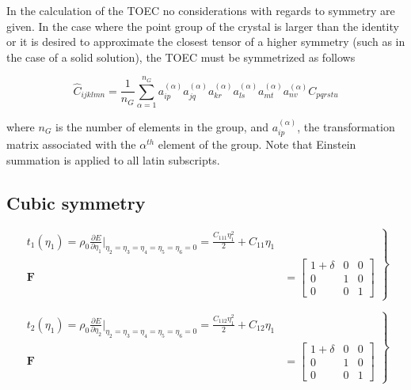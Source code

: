\documentclass[showpacs,aps,floatfix,prb,reprint,superscriptaddress,onecolumn]{revtex4-1}
\begin{document}
\begin{enumerate}
In the calculation of the TOEC no considerations with regards to symmetry are given.  In the case where the point group of the crystal is larger than the identity or it is desired to approximate the closest tensor of a higher symmetry (such as in the case of a solid solution), the TOEC must be symmetrized as follows

\begin{equation}
\hat{C}_{ijklmn} = \frac{1}{n_G} \sum\limits_{\alpha=1}^{n_G}  a^{(\alpha)}_{ip}  a^{(\alpha)}_{jq}  a^{(\alpha)}_{kr}  a^{(\alpha)}_{ls}  a^{(\alpha)}_{mt}  a^{(\alpha)}_{nv} C_{pqrstu}
\end{equation}

where $n_G$ is the number of elements in the group, and $a_{ip}^{(\alpha)}$, the transformation matrix associated with the $\alpha^{th}$ element of the group.  Note that Einstein summation is applied to all latin subscripts.



\subsection{Cubic symmetry}


\begin{equation}
\label{eqn:SM-hexs1}
  \left.\begin{aligned}
        t_{1} \left(\eta_{1}\right) = \rho_{0} \frac{\partial E}{\partial \eta_{1}}\Bigr|_{\eta_2=\eta_3=\eta_4=\eta_5=\eta_6=0} = \frac{C_{111}\eta_{1}^2}{2} + C_{11}\eta_{1}\\
        \bm{F}&=\begin{bmatrix} 1+\delta & 0 & 0 \\ 0 & 1 & 0 \\ 0 & 0 & 1 \end{bmatrix}
       \end{aligned}
			\right\}
\end{equation}


\begin{equation}
\label{eqn:SM-hexs2}
  \left.\begin{aligned}
        t_{2} \left(\eta_{1}\right) = \rho_{0} \frac{\partial E}{\partial \eta_{2}}\Bigr|_{\eta_2=\eta_3=\eta_4=\eta_5=\eta_6=0} = \frac{C_{112}\eta_{1}^2}{2} + C_{12}\eta_{1}\\
        \bm{F}&=\begin{bmatrix} 1+\delta & 0 & 0 \\ 0 & 1 & 0 \\ 0 & 0 & 1 \end{bmatrix}
       \end{aligned}
			\right\}
\end{equation}


\end{enumerate}
\end{document}

